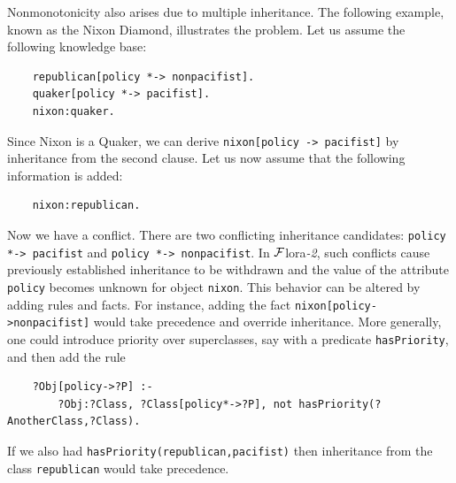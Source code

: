 \documentclass[11pt]{article}
\newcommand{\FLORA}{{\mbox{\sc ${\cal F}${lora}\rm\emph{-2}}}\xspace}
\begin{document}
Nonmonotonicity also arises due to multiple inheritance. The following
example, known as the Nixon Diamond, illustrates the problem. Let us assume
the following knowledge base:
\begin{verbatim}
    republican[policy *-> nonpacifist].
    quaker[policy *-> pacifist].
    nixon:quaker.
\end{verbatim}
Since Nixon is a Quaker, we can derive {\tt nixon[policy -> pacifist]}
by inheritance from the second clause. Let us now assume that the following
information is added:
\begin{verbatim}
    nixon:republican.  
\end{verbatim}
Now we have a conflict. There are two conflicting inheritance candidates:
{\tt policy *-> pacifist} and {\tt policy *-> nonpacifist}.    
In \FLORA, such conflicts cause previously established inheritance
to be withdrawn and the value of the attribute {\tt policy} becomes
unknown for object {\tt nixon}.
This behavior can be altered by adding rules and facts. For instance,
adding the fact {\tt nixon[policy->nonpacifist]} would take precedence and override
inheritance. More generally, one could introduce priority over superclasses, say with  
  a predicate {\tt hasPriority}, and then add the rule
\begin{verbatim}
    ?Obj[policy->?P] :-
        ?Obj:?Class, ?Class[policy*->?P], not hasPriority(?AnotherClass,?Class).
\end{verbatim}
If we also had {\tt hasPriority(republican,pacifist)} then inheritance from
the class {\tt republican} would take precedence. 
\end{document}
